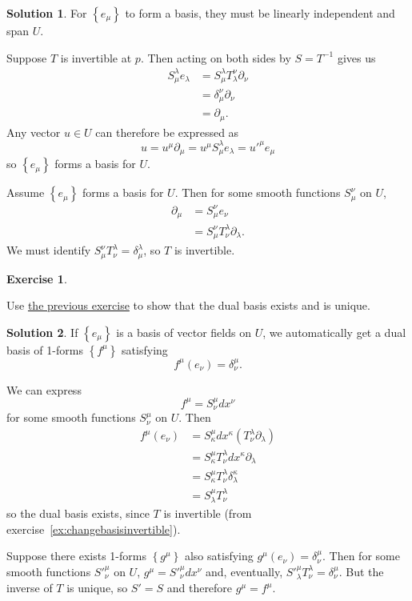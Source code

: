 \documentclass[11pt, a4paper]{report}
\theoremstyle{definition}
\newtheorem{exercise}{Exercise}[part]
\newtheorem{solution}{Solution}[part]
\newenvironment{ex}{\begin{exercise}}{\end{exercise}\pagebreak[1]}
\newenvironment{sol}{\begin{solution}}{\end{solution}\pagebreak[3]}
\begin{document}
\begin{sol}

For $\left\{e_\mu\right\}$ to form a basis, they must be linearly independent and span $U$.

Suppose $T$ is invertible at $p$. Then acting on both sides by $S = T^{-1}$ gives us
\begin{align*}
    S_\mu^\lambda e_\lambda &= S_\mu^\lambda T_\lambda^\nu \partial_\nu \\
        &= \delta_\mu^\nu \partial_\nu \\
        &= \partial_\mu.
\end{align*}
Any vector $u \in U$ can therefore be expressed as
\[
    u = u^\mu \partial_\mu = u^\mu S_\mu^\lambda e_\lambda = u'^\mu e_\mu
\]
so $\left\{e_\mu\right\}$ forms a basis for $U$.

Assume $\left\{e_\mu\right\}$ forms a basis for $U$. Then for some smooth functions $S_\mu^\nu$ on $U$,
\begin{align*}
    \partial_\mu &= S_\mu^\nu e_\nu \\
                 &= S_\mu^\nu T_\nu^\lambda \partial_\lambda.
\end{align*}
We must identify $S_\mu^\nu T_\nu^\lambda = \delta_\mu^\lambda$, so $T$ is invertible.

\end{sol}

\begin{ex}\label{ex:dualbasisexists}

Use \hyperref[ex:changebasisinvertible]{the previous exercise} to show that the dual basis exists and is unique.

\end{ex}

\begin{sol}

If $\left\{e_\mu\right\}$ is a basis of vector fields on $U$, we automatically get a dual basis of 1-forms $\left\{f^\mu\right\}$ satisfying
\[
    f^\mu(e_\nu) = \delta_\nu^\mu.
\]

We can express
\[
    f^\mu = S_\nu^\mu dx^\nu
\]
for some smooth functions $S_\nu^\mu$ on $U$. Then
\begin{align*}
    f^\mu(e_\nu) &= S_\kappa^\mu dx^\kappa (T_\nu^\lambda \partial_\lambda) \\
                 &= S_\kappa^\mu T_\nu^\lambda dx^\kappa \partial_\lambda \\
                 &= S_\kappa^\mu T_\nu^\lambda \delta_\lambda^\kappa \\
                 &= S_\lambda^\mu T_\nu^\lambda
\end{align*}
so the dual basis exists, since $T$ is invertible (from exercise~\ref{ex:changebasisinvertible}).

Suppose there exists 1-forms $\left\{g^\mu\right\}$ also satisfying $g^\mu(e_\nu) = \delta^\mu_\nu$.
Then for some smooth functions $S'^\mu_\nu$ on $U$, $g^\mu = S'^\mu_\nu dx^\nu$ and, eventually, $S'^\mu_\lambda T^\lambda_\nu = \delta ^\mu_\nu$. But the inverse of $T$ is unique, so $S' = S$ and therefore $g^\mu = f^\mu$.

\end{sol}
\end{document}
